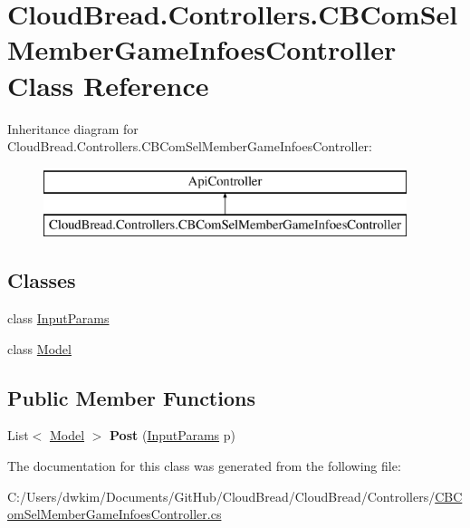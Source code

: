 \hypertarget{a00030}{}\section{Cloud\+Bread.\+Controllers.\+C\+B\+Com\+Sel\+Member\+Game\+Infoes\+Controller Class Reference}
\label{a00030}
Inheritance diagram for Cloud\+Bread.\+Controllers.\+C\+B\+Com\+Sel\+Member\+Game\+Infoes\+Controller\+:\begin{figure}[H]
\begin{center}
\leavevmode
\includegraphics[height=2.000000cm]{a00030}
\end{center}
\end{figure}
\subsection*{Classes}
\begin{DoxyCompactItemize}
\item 
class \hyperlink{a00103}{Input\+Params}
\item 
class \hyperlink{a00160}{Model}
\end{DoxyCompactItemize}
\subsection*{Public Member Functions}
\begin{DoxyCompactItemize}
\item 
List$<$ \hyperlink{a00160}{Model} $>$ {\bfseries Post} (\hyperlink{a00103}{Input\+Params} p)\hypertarget{a00030_ad80cdce46a97b2eaf66b8df6572d0a70}{}\label{a00030_ad80cdce46a97b2eaf66b8df6572d0a70}

\end{DoxyCompactItemize}


The documentation for this class was generated from the following file\+:\begin{DoxyCompactItemize}
\item 
C\+:/\+Users/dwkim/\+Documents/\+Git\+Hub/\+Cloud\+Bread/\+Cloud\+Bread/\+Controllers/\hyperlink{a00203}{C\+B\+Com\+Sel\+Member\+Game\+Infoes\+Controller.\+cs}\end{DoxyCompactItemize}
